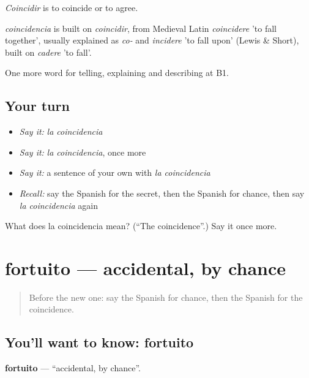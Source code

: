 \emph{Coincidir} is to coincide or to agree.

\begin{cousinweb}
\emph{coincidencia} is built on \emph{coincidir}, from Medieval Latin \emph{coincidere} 'to fall together', usually explained as \emph{co-} and \emph{incidere} 'to fall upon' (Lewis \& Short), built on \emph{cadere} 'to fall'.
\end{cousinweb}

\begin{grammarlens}[title={What you've built}]
One more word for telling, explaining and describing at B1.
\end{grammarlens}

\subsection*{Your turn}
\begin{itemize}
\raggedright
  \item \emph{Say it:} \emph{la coincidencia}
  \item \emph{Say it:} \emph{la coincidencia}, once more
  \item \emph{Say it:} a sentence of your own with \emph{la coincidencia}
  \item \emph{Recall:} say the Spanish for the secret, then the Spanish for chance, then say \emph{la coincidencia} again
\end{itemize}

\begin{tcolorbox}[breakable,colback=teal!4,colframe=teal!35!black,title={Before you move on}]
What does la coincidencia mean? (\textquotedblleft{}The coincidence\textquotedblright{}.) Say it once more.
\end{tcolorbox}
\section[fortuito]{fortuito — accidental, by chance}

\label{lesson:ES-C533-fortuito}



\begin{quote}
Before the new one: say the Spanish for chance, then the Spanish for the coincidence.
\end{quote}

\subsection*{You'll want to know: fortuito}
\textbf{fortuito} — \textquotedblleft{}accidental, by chance\textquotedblright{}.

